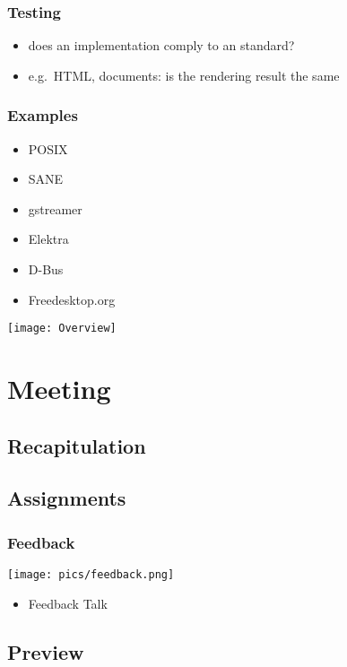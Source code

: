 \begin{frame}
	\frametitle{Testing}

	\begin{itemize}[<+-| alert@+>]
	\item does an implementation comply to an standard?
	\item e.g.\ HTML, documents: is the rendering result the same
	\end{itemize}
\end{frame}

\begin{frame}
	\frametitle{Examples}

	\begin{itemize}[<+-| alert@+>]
	\item POSIX
	\item SANE
	\item gstreamer
	\item Elektra
	\item D-Bus
	\item Freedesktop.org
	\end{itemize}
\end{frame}

\begin{frame}
	\texttt{[image: Overview]}
\end{frame}

\section{Meeting}

\subsection{Recapitulation}
\subsection{Assignments}

\begin{frame}
	\frametitle{Feedback}

	\hfill \texttt{[image: pics/feedback.png]}
	\vspace{-1cm}
	\begin{itemize}
		\item Feedback Talk
	\end{itemize}
\end{frame}

\subsection{Preview}

\appendix

\begin{frame}[allowframebreaks]
	
	
\end{frame}



